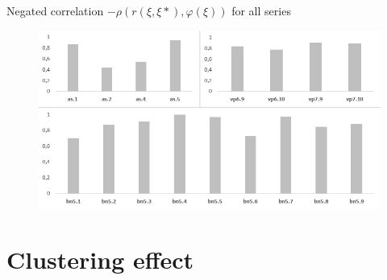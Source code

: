 \documentclass[aspectratio=169,xcolor=dvipsnames]{beamer}
\begin{document}

\begin{frame}{Negated correlation $-\rho(r(\xi, \xi*),\varphi(\xi))$ for all series}
    \begin{figure}
    \includegraphics[scale=0.8]{ro}
    \end{figure}
\end{frame}

\section{Clustering effect}
\end{document}
